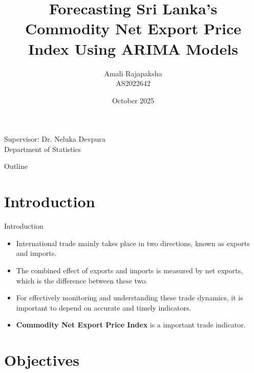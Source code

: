 \documentclass[11pt]{beamer}
\title[Forecasting CNEPI]{Forecasting Sri Lanka’s Commodity Net
	Export Price Index Using ARIMA Models}
\author[Amali Rajapaksha]{Amali Rajapaksha \\ AS2022642}
\institute[Dept. of statistics]{Department of Statistics \\ University of Sri Jayewardenepura}
\date[Oct 2025]{October 2025}
\begin{document}
	
	\begin{frame}
		\titlepage
		\vfill
		\tiny{Supervisor: Dr. Neluka Devpura \\ Department of Statistics }
	\end{frame}
	
	\begin{frame}{Outline}
		\tableofcontents
	\end{frame}
	
	\section{Introduction}
	\begin{frame}{Introduction}
		\begin{itemize}
			\item International trade
			mainly takes place in two directions, known as exports and imports.
			\vspace{0.3cm}
			\item The combined effect of exports and imports is measured by net exports, which is the
			difference between these two.
			\vspace{0.3cm}
			\item  For effectively monitoring and understanding these trade dynamics, it is important to depend on accurate and timely indicators.
			\vspace{0.3cm}
			\item \textbf{Commodity Net
			Export Price Index} is a important trade indicator.
		\end{itemize}
	\end{frame}
	
	\section{Objectives}
	
\end{document}
